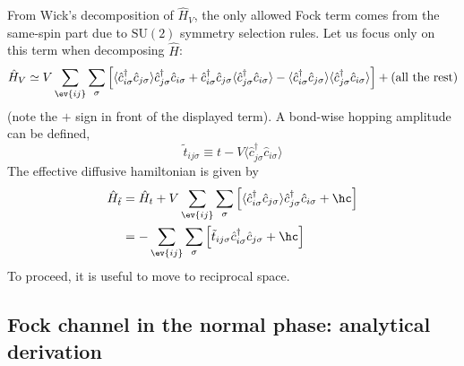 From Wick's decomposition of $\hat H_V$, the only allowed Fock term comes from the same-spin part due to $\mathrm{SU}(2)$ symmetry selection rules. Let us focus only on this term when decomposing $\hat H$:
\begin{equation}\label{eq:real-space-non-local-interaction-fock}
	\hat H_V \simeq 
	V \sum_{\ev{ij}} \sum_\sigma \left[
		\langle
		\hat c_{i\sigma}^\dagger \hat c_{j\sigma}
		\rangle \hat c_{j\sigma}^\dagger  \hat c_{i\sigma} + 
		\hat c_{i\sigma}^\dagger \hat c_{j\sigma}
		\langle \hat c_{j\sigma}^\dagger  \hat c_{i\sigma} \rangle - \langle \hat c_{i\sigma}^\dagger \hat c_{j\sigma}
		\rangle \langle \hat c_{j\sigma}^\dagger  \hat c_{i\sigma} \rangle
	\right] + (\text{all the rest})
\end{equation}
(note the $+$ sign in front of the displayed term). A bond-wise hopping amplitude can be defined,
\[
	\tilde{t}_{ij\sigma} \equiv t - V \langle
	\hat c_{j\sigma}^\dagger \hat c_{i\sigma}
	\rangle
\]
The effective diffusive hamiltonian is given by
\[
\begin{aligned}
	\hat H_{\tilde{t}} &= \hat H_t + V \sum_{\ev{ij}} \sum_\sigma \left[
	\langle
	\hat c_{i\sigma}^\dagger \hat c_{j\sigma}
	\rangle \hat c_{j\sigma}^\dagger  \hat c_{i\sigma} + \hc
	\right] \\
	&= - \sum_{\ev{ij}} \sum_\sigma 
	\left[
	\tilde{t}_{ij\sigma} \hat c_{i\sigma}^\dagger \hat c_{j\sigma} + \hc
	\right]
\end{aligned}
\]
To proceed, it is useful to move to reciprocal space.

\subsection{Fock channel in the normal phase: analytical derivation}\label{subsec:normal-fock-analytical}

